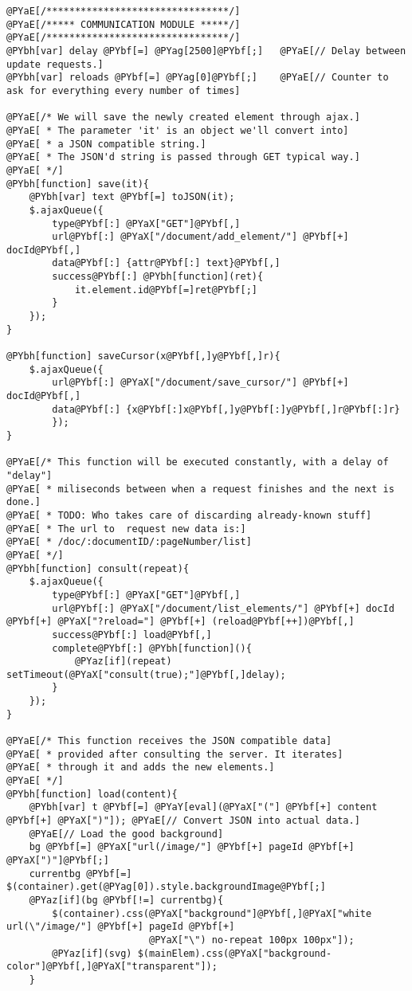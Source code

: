 \begin{Verbatim}[commandchars=@\[\]]
@PYaE[/********************************/]
@PYaE[/***** COMMUNICATION MODULE *****/]
@PYaE[/********************************/]
@PYbh[var] delay @PYbf[=] @PYag[2500]@PYbf[;]	@PYaE[// Delay between update requests.]
@PYbh[var] reloads @PYbf[=] @PYag[0]@PYbf[;]	@PYaE[// Counter to ask for everything every number of times]

@PYaE[/* We will save the newly created element through ajax.]
@PYaE[ * The parameter 'it' is an object we'll convert into]
@PYaE[ * a JSON compatible string.]
@PYaE[ * The JSON'd string is passed through GET typical way.]
@PYaE[ */]
@PYbh[function] save(it){
	@PYbh[var] text @PYbf[=] toJSON(it);
	$.ajaxQueue({
		type@PYbf[:] @PYaX["GET"]@PYbf[,]
		url@PYbf[:] @PYaX["/document/add_element/"] @PYbf[+] docId@PYbf[,]
		data@PYbf[:] {attr@PYbf[:] text}@PYbf[,]
		success@PYbf[:] @PYbh[function](ret){
			it.element.id@PYbf[=]ret@PYbf[;]
		}
	});
}

@PYbh[function] saveCursor(x@PYbf[,]y@PYbf[,]r){
	$.ajaxQueue({
		url@PYbf[:] @PYaX["/document/save_cursor/"] @PYbf[+] docId@PYbf[,]
		data@PYbf[:] {x@PYbf[:]x@PYbf[,]y@PYbf[:]y@PYbf[,]r@PYbf[:]r}
		});
}

@PYaE[/* This function will be executed constantly, with a delay of "delay"]
@PYaE[ * miliseconds between when a request finishes and the next is done.]
@PYaE[ * TODO: Who takes care of discarding already-known stuff]
@PYaE[ * The url to  request new data is:]
@PYaE[ * /doc/:documentID/:pageNumber/list]
@PYaE[ */]
@PYbh[function] consult(repeat){
	$.ajaxQueue({
		type@PYbf[:] @PYaX["GET"]@PYbf[,]
		url@PYbf[:] @PYaX["/document/list_elements/"] @PYbf[+] docId @PYbf[+] @PYaX["?reload="] @PYbf[+] (reload@PYbf[++])@PYbf[,]
		success@PYbf[:] load@PYbf[,]
		complete@PYbf[:] @PYbh[function](){
			@PYaz[if](repeat) setTimeout(@PYaX["consult(true);"]@PYbf[,]delay);
		}
	});
}

@PYaE[/* This function receives the JSON compatible data]
@PYaE[ * provided after consulting the server. It iterates]
@PYaE[ * through it and adds the new elements.]
@PYaE[ */]
@PYbh[function] load(content){
	@PYbh[var] t @PYbf[=] @PYaY[eval](@PYaX["("] @PYbf[+] content @PYbf[+] @PYaX[")"]);	@PYaE[// Convert JSON into actual data.]
	@PYaE[// Load the good background]
	bg @PYbf[=] @PYaX["url(/image/"] @PYbf[+] pageId @PYbf[+] @PYaX[")"]@PYbf[;]
	currentbg @PYbf[=] $(container).get(@PYag[0]).style.backgroundImage@PYbf[;]
	@PYaz[if](bg @PYbf[!=] currentbg){
		$(container).css(@PYaX["background"]@PYbf[,]@PYaX["white url(\"/image/"] @PYbf[+] pageId @PYbf[+] 
		                 @PYaX["\") no-repeat 100px 100px"]);
		@PYaz[if](svg) $(mainElem).css(@PYaX["background-color"]@PYbf[,]@PYaX["transparent"]);		
	}	
	

\end{Verbatim}
